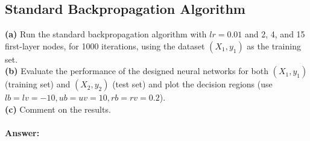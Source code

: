 \documentclass[a4paper,12pt]{article}
\begin{document}
\newpage


\subsection{Standard Backpropagation Algorithm}
\textbf{(a)} Run the standard backpropagation algorithm with $lr = 0.01$ and 2, 4, and 15 first-layer nodes, for 1000 iterations, using the dataset $(X_1, y_1)$ as the training set.
\\
\textbf{(b)} Evaluate the performance of the designed neural networks for both $(X_1, y_1)$ (training set) and $(X_2, y_2)$ (test set) and plot the decision regions (use $lb = lv = -10, ub = uv = 10, rb = rv = 0.2$).
\\ 
\textbf{(c)} Comment on the results. \\
\\
\textbf{Answer:} 
\end{document}
